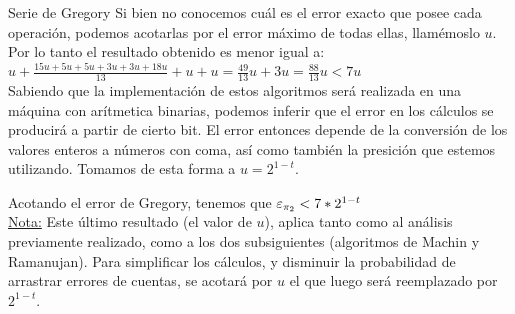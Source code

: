 \begin{subsubsection}{Serie de Gregory}
	Si bien no conocemos cuál es el error exacto que posee cada operación, podemos acotarlas por el error máximo de todas ellas, llamémoslo $u$. Por lo tanto el resultado obtenido es menor igual a:\\

	$u + \frac{15u + 5u + 5u + 3u + 3u + 18u}{13} + u + u = \frac{49}{13}u + 3u = \frac{88}{13}u < 7u$\\

	Sabiendo que la implementación de estos algoritmos será realizada en una máquina con arítmetica binarias, podemos inferir que el error en los cálculos se producirá a partir de cierto bit. El error entonces depende de la conversión de los valores enteros a números con coma, así como también la presición que estemos utilizando. Tomamos de esta forma a $u=2^{1-t}$.
	
	Acotando el error de Gregory, tenemos que $\varepsilon _{\pi_2} < 7*2^{1-t}$\\
	
	\underline{Nota:} Este último resultado (el valor de $u$), aplica tanto como al análisis previamente realizado, como a los dos subsiguientes (algoritmos de Machin y Ramanujan). Para simplificar los cálculos, y disminuir la probabilidad de arrastrar errores de cuentas, se acotará por $u$ el que luego será reemplazado por $2^{1-t}$.
\end{subsubsection}